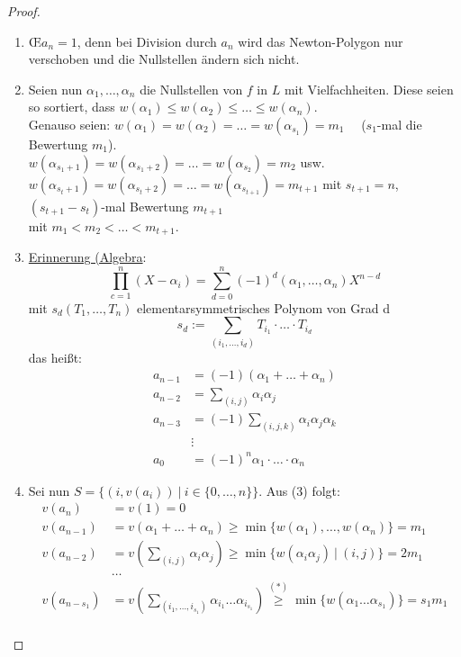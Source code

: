 
\begin{proof}
\begin{enumerate}[(1)]
\item \OE $a_n=1$, denn bei Division durch $a_n$ wird das Newton-Polygon nur verschoben und die Nullstellen ändern sich nicht.
\item Seien nun $\alpha_1, \dots, \alpha_n$ die Nullstellen von $f$ in $L$ mit Vielfachheiten. Diese seien so sortiert, dass $w(\alpha_1) \leq w(\alpha_2) \leq \ldots \leq w(\alpha_n)$.\\
Genauso seien: $w(\alpha_1) = w(\alpha_2)=\ldots = w(\alpha_{s_1})=m_1 \quad$ ($s_1$-mal die Bewertung $m_1$).\\
$w(\alpha_{s_1+1}) = w(\alpha_{s_1+2})=\ldots = w(\alpha_{s_2})=m_2 $ usw.\\
$w(\alpha_{s_t+1}) = w(\alpha_{s_t+2})=\ldots = w(\alpha_{s_{t+1}})=m_{t+1} $ mit $s_{t+1}=n$, $(s_{t+1}-s_t)$-mal Bewertung $m_{t+1}$\\
mit $m_1 < m_2 < \dots < m_{t+1}$.
\item \underline{Erinnerung (Algebra}:
\[\prod_{c=1}^n (X-\alpha_i) = \sum_{d=0}^n (-1)^d (\alpha_1, \dots, \alpha_n) X^{n-d}\]
mit $s_d(T_1, \dots, T_n)$ elementarsymmetrisches Polynom von Grad d
\[s_d:=\sum_{(i_1, \dots, i_d)} T_{i_1} \cdot \ldots \cdot T_{i_d}\]
das heißt:
\begin{align*}
a_{n-1}&=(-1)(\alpha_1+\dots+\alpha_n)\\
a_{n-2}&=\sum_{(i,j)} \alpha_i \alpha_j\\
a_{n-3}&=(-1)\sum_{(i,j,k)} \alpha_i \alpha_j\alpha_k\\
&\vdots\\
a_0&=(-1)^n \alpha_1 \cdot \ldots \cdot \alpha_n
\end{align*}
\item Sei nun $S=\{(i,v(a_i)) \ | \ i \in \{0, \dots, n\}\}$. Aus (3) folgt:
\begin{align*}
v(a_n)&=v(1)=0\\
v(a_{n-1})&=v(\alpha_1 +\dots + \alpha_n) \geq \min \{w(\alpha_1), \dots, w(\alpha_n)\}=m_1\\
v(a_{n-2})&=v(\sum_{(i,j)} \alpha_i \alpha_j) \geq \min \{w(\alpha_i \alpha_j) \ | \ (i,j) \}=2 m_1\\
&\dots\\
v(a_{n-s_1})&=v(\sum_{(i_1,\dots, i_{s_1})} \alpha_{i_1} \dots \alpha_{i_{s_1}}) \stackrel{(*)}{\geq}\min \{w(\alpha_1 \dots \alpha_{s_1})\}=s_1 m_1\\

\end{align*}
\end{enumerate}
\end{proof}
